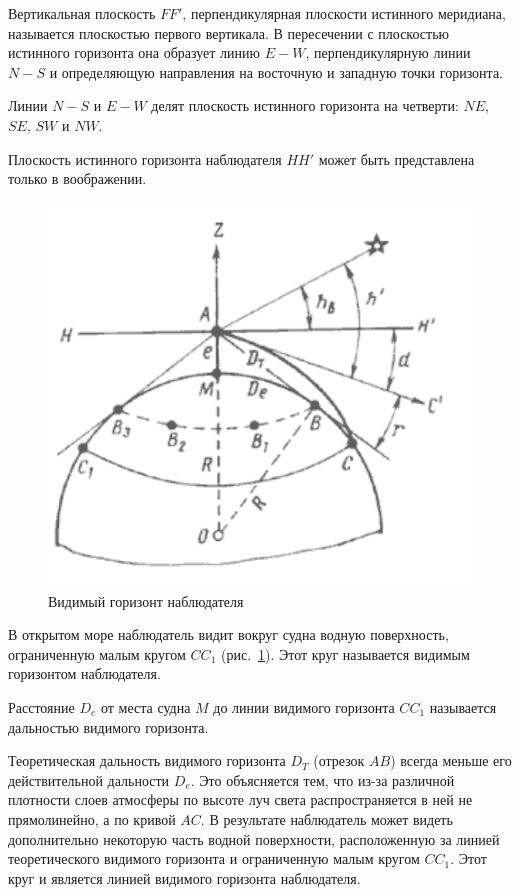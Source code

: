 \documentclass[a4paper, 12pt, twoside, final, book, russian, fittopage, cyremdash]{ncc}
\newcommand{\ris}[1]{\ref{fig:#1}}
\begin{document}
Вертикальная плоскость $FF'$, перпендикулярная плоскости истинного меридиана, называется плоскостью первого вертикала. В пересечении с плоскостью истинного горизонта она образует линию $E-W$, перпендикулярную линии $N-S$ и определяющую направления на восточную и западную точки горизонта. 

Линии $N-S$ и $E-W$ делят плоскость истинного горизонта на четверти: $NE$, $SE$, $SW$ и $NW$. 

Плоскость истинного горизонта наблюдателя $HH'$ может быть представлена только в воображении. 

\begin{figure}[htb]
  \centering{}
  \includegraphics{N005}
  \caption{Видимый горизонт наблюдателя}
  \label{fig:N5}
\end{figure}

В открытом море наблюдатель видит вокруг судна водную поверхность, ограниченную малым кругом $CC_1$ (рис.~\ris{N5}). Этот круг называется видимым горизонтом наблюдателя. 

Расстояние $D_e$ от места судна $M$ до линии видимого горизонта $CC_1$ называется дальностью видимого горизонта. 

Теоретическая дальность видимого горизонта $D_T$ (отрезок $AB$) всегда меньше его действительной дальности $D_e$. Это объясняется тем, что из-за различной плотности слоев атмосферы по высоте луч света распространяется в ней не прямолинейно, а по кривой $AC$. В результате наблюдатель может видеть дополнительно некоторую часть водной поверхности, расположенную за линией теоретического видимого горизонта и ограниченную малым кругом $CC_1$. Этот круг и является линией видимого горизонта наблюдателя. 
\end{document}
